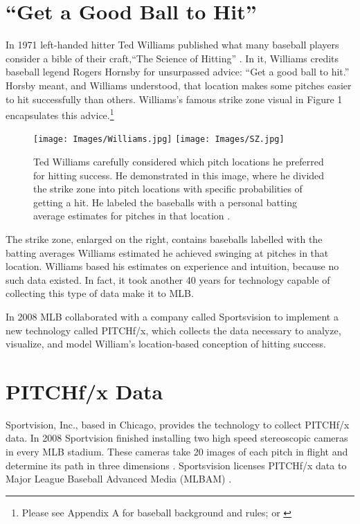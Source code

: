 \section{``Get a Good Ball to Hit''}
In 1971 left-handed hitter Ted Williams published what many baseball players consider a bible of their craft,``The Science of Hitting'' \citep{Williams1971}. In it, Williams credits baseball legend Rogers Hornsby for unsurpassed advice: ``Get a good ball to hit.'' Horsby meant, and Williams understood, that location makes some pitches easier to hit successfully than others. Williams's famous strike zone visual in Figure 1 encapsulates this advice.\footnote{Please see Appendix A for baseball background and rules; or \citep{Wiki}}
        \begin{figure}[H]
      	\centering
      	\texttt{[image: Images/Williams.jpg]} 
      	\texttt{[image: Images/SZ.jpg]}
      	\caption{Ted Williams carefully considered which pitch locations he preferred for hitting success. He demonstrated in this image, where he divided the strike zone into pitch locations with specific probabilities of getting a hit. He labeled the baseballs with a personal batting average estimates for pitches in that location \citep{Williams1971}.}
      	\end{figure} 
The strike zone, enlarged on the right, contains baseballs labelled with the batting averages Williams estimated he achieved swinging at pitches in that location. Williams based his estimates on experience and intuition, because no such data existed. In fact, it took another 40 years for technology capable of collecting this type of data make it to MLB\textsuperscript{\textregistered}.

In 2008 MLB collaborated with a company called Sportsvision to implement a new technology called PITCHf/x\textsuperscript{\textregistered}, which collects the data necessary to analyze, visualize, and model William's location-based conception of hitting success.

\section{PITCHf/x\textsuperscript{\textregistered} Data} %
Sportvision, Inc., based in Chicago, provides the technology to collect PITCHf/x\textsuperscript{\textregistered} data. In 2008 Sportvision finished installing two high speed stereoscopic cameras in every MLB\textsuperscript{\textregistered} stadium. These cameras take 20 images of each pitch in flight and determine its path in three dimensions \citep{Fast2010}. Sportsvision licenses PITCHf/x\textsuperscript{\textregistered} data to Major League Baseball Advanced Media (MLBAM\textsuperscript{\textregistered}) \citep{Baumer2010}. 

